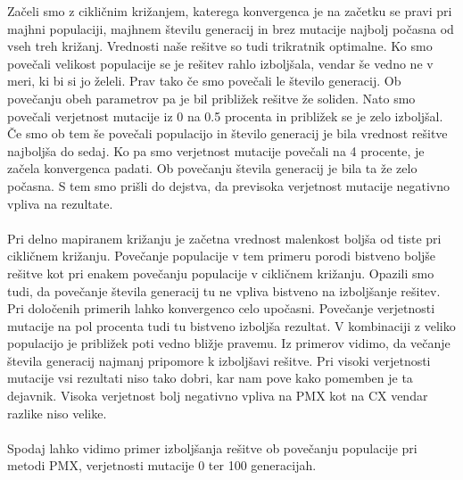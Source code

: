 \documentclass[12pt,a4paper]{amsart}
\theoremstyle{definition} %
\theoremstyle{plain} %
\begin{document}
Začeli smo z cikličnim križanjem, katerega konvergenca je na začetku se pravi pri majhni populaciji, majhnem številu generacij in brez mutacije najbolj počasna od vseh treh križanj. Vrednosti naše rešitve so tudi trikratnik optimalne. Ko smo povečali velikost populacije se je rešitev rahlo izboljšala, vendar še vedno ne v meri, ki bi si jo želeli. Prav tako če smo povečali le število generacij. Ob povečanju obeh parametrov pa je bil približek rešitve že soliden. 
Nato smo povečali verjetnost mutacije iz 0 na 0.5 procenta in približek se je zelo izboljšal. Če smo ob tem še povečali populacijo in število generacij je bila vrednost rešitve najboljša do sedaj. 
Ko pa smo verjetnost mutacije povečali na 4 procente, je začela konvergenca padati. Ob povečanju števila generacij je bila ta že zelo počasna. 
S tem smo prišli do dejstva, da previsoka verjetnost mutacije negativno vpliva na rezultate. 
\\
\\
Pri delno mapiranem križanju je začetna vrednost malenkost boljša od tiste pri cikličnem križanju. Povečanje populacije v tem primeru porodi bistveno boljše rešitve kot pri enakem povečanju populacije v cikličnem križanju. 
Opazili smo tudi, da povečanje števila generacij tu ne vpliva bistveno na izboljšanje rešitev. Pri določenih primerih lahko konvergenco celo upočasni. 
Povečanje verjetnosti mutacije na pol procenta tudi tu bistveno izboljša rezultat. V kombinaciji z veliko populacijo je približek poti vedno bližje pravemu. 
Iz primerov vidimo, da večanje števila generacij najmanj pripomore k izboljšavi rešitve. 
Pri visoki verjetnosti mutacije vsi rezultati niso tako dobri, kar nam pove kako pomemben je ta dejavnik. Visoka verjetnost bolj negativno vpliva na PMX kot na CX vendar razlike niso velike. 
\\
\\
Spodaj lahko vidimo primer izboljšanja rešitve ob povečanju populacije pri metodi PMX, verjetnosti mutacije 0 ter 100 generacijah.
\\
\\
\end{document}
